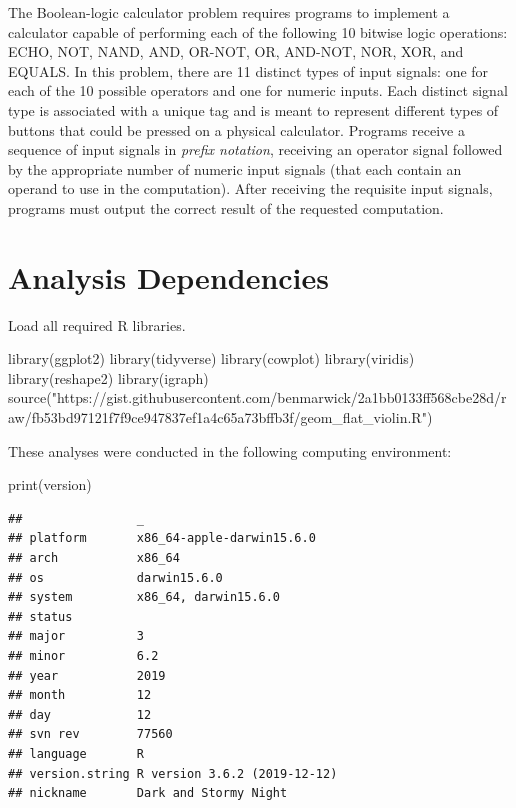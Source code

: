 \documentclass[
]{book}
\newenvironment{Shaded}{\begin{snugshade}}{\end{snugshade}}
\newcommand{\FunctionTok}[1]{\textcolor[rgb]{0.00,0.00,0.00}{#1}}
\newcommand{\NormalTok}[1]{#1}
\newcommand{\StringTok}[1]{\textcolor[rgb]{0.31,0.60,0.02}{#1}}
\begin{document}
The Boolean-logic calculator problem requires programs to implement a calculator capable of performing each of the following 10 bitwise logic operations:
ECHO, NOT, NAND, AND, OR-NOT, OR, AND-NOT, NOR, XOR, and EQUALS.
In this problem, there are 11 distinct types of input signals: one for each of the 10 possible operators and one for numeric inputs.
Each distinct signal type is associated with a unique tag and is meant to represent different types of buttons that could be pressed on a physical calculator.
Programs receive a sequence of input signals in \emph{prefix notation}, receiving an operator signal followed by the appropriate number of numeric input signals (that each contain an operand to use in the computation).
After receiving the requisite input signals, programs must output the correct result of the requested computation.

\hypertarget{analysis-dependencies-3}{%
\section{Analysis Dependencies}\label{analysis-dependencies-3}}

Load all required R libraries.

\begin{Shaded}
\begin{Highlighting}[]
\FunctionTok{library}\NormalTok{(ggplot2)}
\FunctionTok{library}\NormalTok{(tidyverse)}
\FunctionTok{library}\NormalTok{(cowplot)}
\FunctionTok{library}\NormalTok{(viridis)}
\FunctionTok{library}\NormalTok{(reshape2)}
\FunctionTok{library}\NormalTok{(igraph)}
\FunctionTok{source}\NormalTok{(}\StringTok{"https://gist.githubusercontent.com/benmarwick/2a1bb0133ff568cbe28d/raw/fb53bd97121f7f9ce947837ef1a4c65a73bffb3f/geom\_flat\_violin.R"}\NormalTok{)}
\end{Highlighting}
\end{Shaded}

These analyses were conducted in the following computing environment:

\begin{Shaded}
\begin{Highlighting}[]
\FunctionTok{print}\NormalTok{(version)}
\end{Highlighting}
\end{Shaded}

\begin{verbatim}
##                _                           
## platform       x86_64-apple-darwin15.6.0   
## arch           x86_64                      
## os             darwin15.6.0                
## system         x86_64, darwin15.6.0        
## status                                     
## major          3                           
## minor          6.2                         
## year           2019                        
## month          12                          
## day            12                          
## svn rev        77560                       
## language       R                           
## version.string R version 3.6.2 (2019-12-12)
## nickname       Dark and Stormy Night
\end{verbatim}
\end{document}
